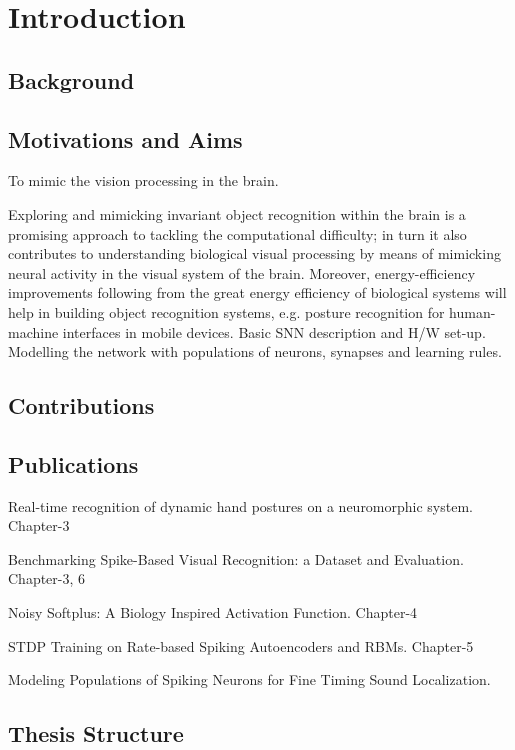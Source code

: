 \chapter{Introduction}
\label{cha:intro}
\section{Background}
\label{sec:pre_aim}
\section{Motivations and Aims}
\label{sec:aim}
To mimic the vision processing in the brain.

Exploring and mimicking invariant object recognition within the brain is a promising approach to tackling the computational difficulty;
in turn it also contributes to understanding biological visual processing by means of mimicking neural activity in the visual system of the brain.
Moreover, energy-efficiency improvements following from the great energy efficiency of biological systems will help in building object recognition systems, e.g. posture recognition for human-machine interfaces in mobile devices.  
Basic SNN description and H/W set-up.\\
Modelling the network with populations of neurons, synapses and learning rules.

\section{Contributions}
\label{sec:ctb}

\section{Publications}
Real-time recognition of dynamic hand postures on a neuromorphic system. Chapter-3

Benchmarking Spike-Based Visual Recognition: a Dataset and Evaluation. Chapter-3, 6

Noisy Softplus: A Biology Inspired Activation Function. Chapter-4

STDP Training on Rate-based Spiking Autoencoders and RBMs. Chapter-5

Modeling  Populations  of  Spiking  Neurons  for  Fine  Timing  Sound Localization.
\section{Thesis Structure}
\label{sec:str}
